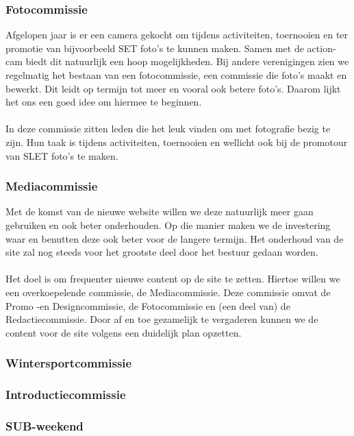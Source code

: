 \documentclass[]{article}
\begin{document}
\subsubsection{Fotocommissie}
Afgelopen jaar is er een camera gekocht om tijdens activiteiten, toernooien en ter promotie van bijvoorbeeld SET foto's te kunnen maken. Samen met de action-cam biedt dit natuurlijk een hoop mogelijkheden. Bij andere verenigingen zien we regelmatig het bestaan van een fotocommissie, een commissie die foto's maakt en bewerkt. Dit leidt op termijn tot meer en vooral ook betere foto's. Daarom lijkt het ons een goed idee om hiermee te beginnen.\\\\
In deze commissie zitten leden die het leuk vinden om met fotografie bezig te zijn. Hun taak is tijdens activiteiten, toernooien en wellicht ook bij de promotour van SLET foto's te maken.

\subsubsection{Mediacommissie}
Met de komst van de nieuwe website willen we deze natuurlijk meer gaan gebruiken en ook beter onderhouden. Op die manier maken we de investering waar en benutten deze ook beter voor de langere termijn. Het onderhoud van de site zal nog steeds voor het grootste deel door het bestuur gedaan worden.\\\\
Het doel is om frequenter nieuwe content op de site te zetten. Hiertoe willen we een overkoepelende commissie, de Mediacommissie. Deze commissie omvat de Promo -en Designcommissie, de Fotocommissie en (een deel van) de Redactiecommissie. Door af en toe gezamelijk te vergaderen kunnen we de content voor de site volgens een duidelijk plan opzetten.

\subsubsection{Wintersportcommissie}

\subsubsection{Introductiecommissie}

\subsubsection{SUB-weekend}
\end{document}
